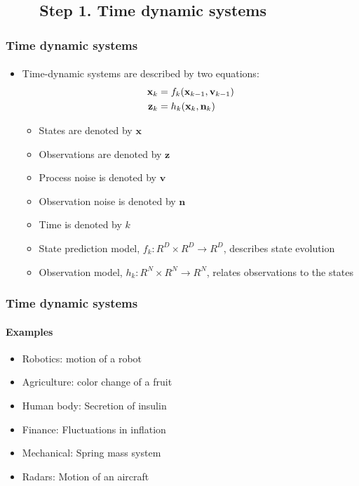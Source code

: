\documentclass{beamer}
\begin{document}
\subsection{\ \ \ \ Step 1. Time dynamic systems}
\begin{frame}
\frametitle{Time dynamic systems}
\framesubtitle{}
\mypagenum
\begin{itemize}
\item Time-dynamic systems are described by two equations:
\begin{align*}
\mathbf{x}_k &= f_k(\mathbf{x}_{k-1}, \mathbf{v}_{k-1}) \notag\\
\mathbf{z}_k &= h_k(\mathbf{x}_k, \mathbf{n}_k)
\label{Eq:TDS}
\end{align*}
\begin{itemize}
\item States are denoted by $\mathbf{x}$
\item Observations are denoted by $\mathbf{z}$
\item Process noise is denoted by $\mathbf{v}$
\item Observation noise is denoted by $\mathbf{n}$
\item Time is denoted by $k$
\item State prediction model, ${f_k:R^D \times R^D \rightarrow R^D}$, describes state evolution
\item Observation model, ${h_k:R^N \times R^N \rightarrow R^N}$, relates observations to the states
\end{itemize}
\end{itemize}
\end{frame}



\begin{frame}
\frametitle{Time dynamic systems}
\framesubtitle{Examples}
\mypagenum
\begin{itemize}
\item Robotics: motion of a robot
\item Agriculture: color change of a fruit
\item Human body: Secretion of insulin
\item Finance: Fluctuations in inflation
\item Mechanical: Spring mass system
\item Radars: Motion of an aircraft
\end{itemize}
\end{frame}
\end{document}
